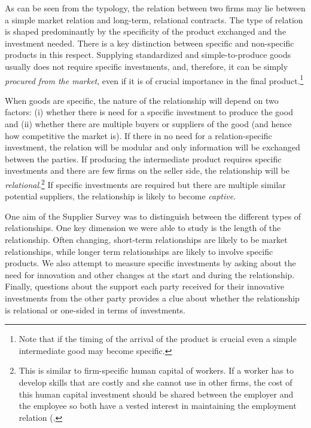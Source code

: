 \usepackage{}\documentclass[final, dvipsnames, authoryear,12pt]{elsarticle}
\begin{document}
As can be seen from the typology, the relation between two firms may lie between a simple market relation and long-term, relational contracts. The type of relation is shaped predominantly by the specificity of the product exchanged and the investment needed. There is a key distinction between specific and non-specific products in this respect. Supplying standardized and simple-to-produce goods usually does not require specific investments, and, therefore, it can be simply \textit{procured from the market}, even if it is of crucial importance in the final product.\footnote{Note that if the timing of the arrival of the product is crucial even a simple intermediate good may become specific.} 

When goods are specific, the nature of the relationship will depend on two factors: (i) whether there is need for a specific investment to produce the good and (ii) whether there are multiple buyers or suppliers of the good (and hence how competitive the market is). If there in no need for a relation-specific investment, the relation will be modular and only information will be exchanged between the parties. If producing the intermediate product requires specific investments and there are few firms on the seller side, the relationship will be \textit{relational}.\footnote{This is similar to firm-specific human capital of workers. If a worker has to develop skills that are costly and she cannot use in other firms, the cost of this human capital investment should be shared between the employer and the employee so both have a vested interest in maintaining the employment relation (\cite{becker1962investment}.} If specific investments are required but there are multiple similar potential suppliers, the relationship is likely to become \textit{captive}.

One aim of the Supplier Survey was to distinguish between the different types of relationships. One key dimension we were able to study is the length of the relationship. Often changing, short-term relationships are likely to be market relationships, while longer term relationships are likely to involve specific products. We also attempt to measure specific investments by asking about the need for innovation and other changes at the start and during the relationship. Finally, questions about the support each party received for their innovative investments from the other party provides a clue about whether the relationship is relational or one-sided in terms of investments. 

    
\end{document}
